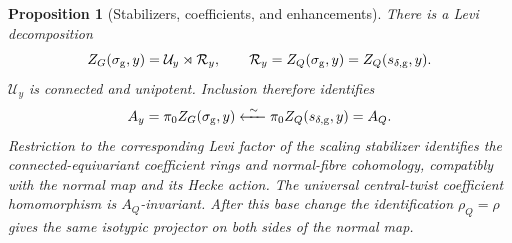 \documentclass[11pt]{amsart}
\newtheorem{proposition}[theorem]{Proposition}
\theoremstyle{definition}
\theoremstyle{remark}
\begin{document}
\begin{proposition}[Stabilizers, coefficients, and enhancements]
\label{prop:two-component-groups}
There is a Levi decomposition
\begin{equation}\label{eq:component-stabilizers}
 Z_G(\sigma_{\rm g},y)=\mathcal U_y\rtimes\mathcal R_y,
 \qquad
 \mathcal R_y=Z_Q(\sigma_{\rm g},y)=Z_Q(s_{\delta,{\rm g}},y).
\end{equation}
$\mathcal U_y$ is connected and unipotent.  Inclusion therefore identifies
\[
 A_y=\pi_0Z_G(\sigma_{\rm g},y)
 \xleftarrow{\ \sim\ }
 \pi_0Z_Q(s_{\delta,{\rm g}},y)=A_Q.
\]
Restriction to the corresponding Levi factor of the scaling stabilizer
identifies the connected-equivariant coefficient rings and normal-fibre
cohomology, compatibly with the normal map and its Hecke action.
The universal central-twist coefficient homomorphism is $A_Q$-invariant.
After this base change the identification $\rho_Q=\rho$ gives the same
isotypic projector on both sides of the normal map.
\end{proposition}
\end{document}
